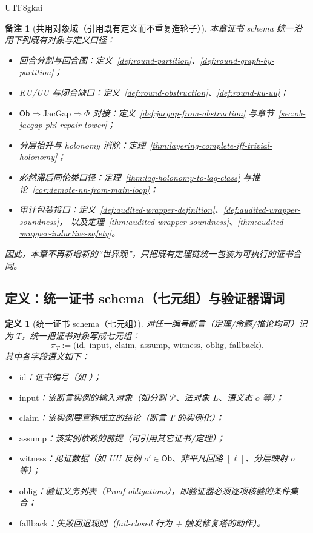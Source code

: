 \documentclass[12pt]{article}
\newtheorem{definition}{定义}[section]
\newtheorem{remark}{备注}[section]
\newcommand{\code}[1]{\path{#1}}
\newcommand{\JacGap}{\ensuremath{\mathrm{JacGap}}} %
\begin{document}
\begin{CJK*}{UTF8}{gkai}
\begin{remark}[共用对象域（引用既有定义而不重复造轮子）]
本章证书 schema 统一沿用下列既有对象与定义口径：
\begin{itemize}
  \item 回合分割与回合图：定义~\ref{def:round-partition}、\ref{def:round-graph-by-partition}；
  \item KU/UU 与闭合缺口：定义~\ref{def:round-obstruction}、\ref{def:round-ku-uu}；
  \item $\mathsf{Ob}\Rightarrow \JacGap \Rightarrow \Phi$ 对接：定义~\ref{def:jacgap-from-obstruction} 与章节~\ref{sec:ob-jacgap-phi-repair-tower}；
  \item 分层抬升与 holonomy 消除：定理~\ref{thm:layering-complete-iff-trivial-holonomy}；
  \item 必然滞后同伦类口径：定理~\ref{thm:lag-holonomy-to-lag-class} 与推论~\ref{cor:demote-nn-from-main-loop}；
  \item 审计包装接口：定义~\ref{def:audited-wrapper-definition}、\ref{def:audited-wrapper-soundness}，
  以及定理~\ref{thm:audited-wrapper-soundness}、\ref{thm:audited-wrapper-inductive-safety}。
\end{itemize}
因此，本章不再新增新的“世界观”，只把既有定理链统一包装为可执行的证书合同。
\end{remark}

\subsection{定义：统一证书 schema（七元组）与验证器谓词}
\label{sec:certschema-definition}

\begin{definition}[统一证书 schema（七元组）]
\label{def:certificate-schema-7tuple}
对任一编号断言（定理/命题/推论均可）记为 $T$，统一把证书对象写成七元组：
\[
  \pi_T :=
  \bigl(\mathrm{id},\ \mathrm{input},\ \mathrm{claim},\ \mathrm{assump},\ \mathrm{witness},\ \mathrm{oblig},\
    \mathrm{fallback}\bigr).
\]
其中各字段语义如下：
\begin{itemize}
  \item $\mathrm{id}$：证书编号（如 \code{Cert-T\_Open-0007}）；
  \item $\mathrm{input}$：该断言实例的输入对象（如分割 $\mathcal{P}$、法对象 $L$、语义态 $o$ 等）；
  \item $\mathrm{claim}$：该实例要宣称成立的结论（断言 $T$ 的实例化）；
  \item $\mathrm{assump}$：该实例依赖的前提（可引用其它证书/定理）；
  \item $\mathrm{witness}$：见证数据（如 UU 反例 $o'\in \mathsf{Ob}$、非平凡回路 $[\ell]$、分层映射 $\sigma$ 等）；
  \item $\mathrm{oblig}$：验证义务列表（Proof obligations），即验证器必须逐项核验的条件集合；
  \item $\mathrm{fallback}$：失败回退规则（fail-closed 行为 + 触发修复塔的动作）。
\end{itemize}
\end{definition}


\end{CJK*}
\end{document}
